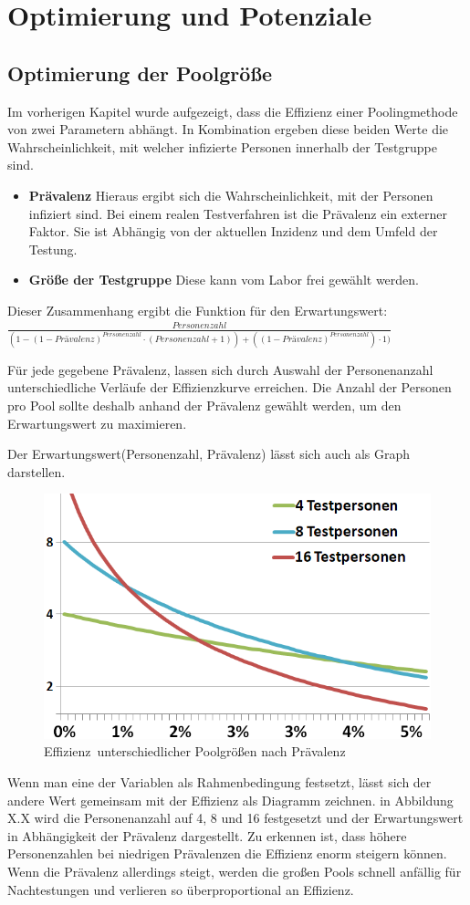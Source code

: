 \chapter{Optimierung und Potenziale}
\section{Optimierung der Poolgröße}
Im vorherigen Kapitel wurde aufgezeigt, dass die Effizienz einer Poolingmethode von zwei Parametern abhängt.
In Kombination ergeben diese beiden Werte die Wahrscheinlichkeit, mit welcher infizierte Personen innerhalb der Testgruppe sind.
\begin{itemize}
	\item \textbf{Prävalenz} Hieraus ergibt sich die Wahrscheinlichkeit, mit der Personen infiziert sind.
	Bei einem realen Testverfahren ist die Prävalenz ein externer Faktor.
	Sie ist Abhängig von der aktuellen Inzidenz und dem Umfeld der Testung.
	\item \textbf{Größe der Testgruppe} Diese kann vom Labor frei gewählt werden.
\end{itemize}

Dieser Zusammenhang ergibt die Funktion für den Erwartungswert:\newline
$\frac{Personenzahl}{(1 - (1-Prävalenz)^{Personenzahl} \cdot (Personenzahl + 1)) + ((1-Prävalenz)^{Personenzahl}) \cdot 1)}$

Für jede gegebene Prävalenz, lassen sich durch Auswahl der Personenanzahl unterschiedliche Verläufe der Effizienzkurve erreichen.
Die Anzahl der Personen pro Pool sollte deshalb anhand der Prävalenz gewählt werden, um den Erwartungswert zu maximieren.

Der Erwartungswert(Personenzahl, Prävalenz) lässt sich auch als Graph darstellen.
\begin{figure}
	\includegraphics[width=.48\textwidth]{img/PraevalenzZuTestgruppe}
	\caption{\mbox{Effizienz unterschiedlicher} \mbox{Poolgrößen} nach Prävalenz\footnotemark}
\end{figure}
Wenn man eine der Variablen als Rahmenbedingung festsetzt, lässt sich der andere Wert gemeinsam mit der Effizienz als Diagramm zeichnen.
in Abbildung X.X wird die Personenanzahl auf 4, 8 und 16 festgesetzt und der Erwartungswert in Abhängigkeit der Prävalenz dargestellt.
Zu erkennen ist, dass höhere Personenzahlen bei niedrigen Prävalenzen die Effizienz enorm steigern können.
Wenn die Prävalenz allerdings steigt, werden die großen Pools schnell anfällig für Nachtestungen und verlieren so überproportional an Effizienz.

